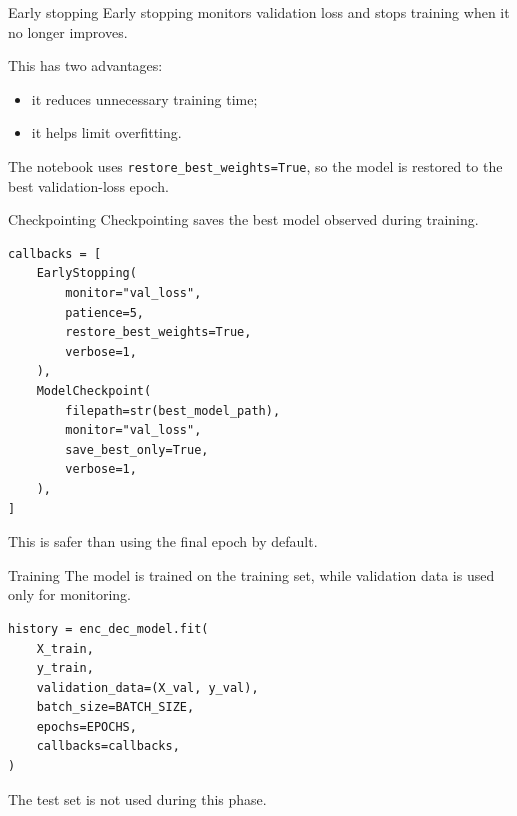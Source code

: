 \documentclass[aspectratio=169]{beamer}
\begin{document}
%
%
\begin{frame}[fragile]{Early stopping}
Early stopping monitors validation loss and stops training when it no longer improves.

\vspace{0.3cm}
This has two advantages:
\begin{itemize}
    \item it reduces unnecessary training time;
    \item it helps limit overfitting.
\end{itemize}

\vspace{0.3cm}
The notebook uses \texttt{restore\_best\_weights=True}, so the model is restored to the best validation-loss epoch.
\end{frame}
%
%
\begin{frame}[fragile]{Checkpointing}
Checkpointing saves the best model observed during training.

\begin{lstlisting}
callbacks = [
    EarlyStopping(
        monitor="val_loss",
        patience=5,
        restore_best_weights=True,
        verbose=1,
    ),
    ModelCheckpoint(
        filepath=str(best_model_path),
        monitor="val_loss",
        save_best_only=True,
        verbose=1,
    ),
]
\end{lstlisting}

This is safer than using the final epoch by default.
\end{frame}
%
%
\begin{frame}[fragile]{Training}
The model is trained on the training set, while validation data is used only for monitoring.

\begin{lstlisting}
history = enc_dec_model.fit(
    X_train,
    y_train,
    validation_data=(X_val, y_val),
    batch_size=BATCH_SIZE,
    epochs=EPOCHS,
    callbacks=callbacks,
)
\end{lstlisting}

\vspace{0.2cm}
The test set is not used during this phase.
\end{frame}
%
\end{document}

